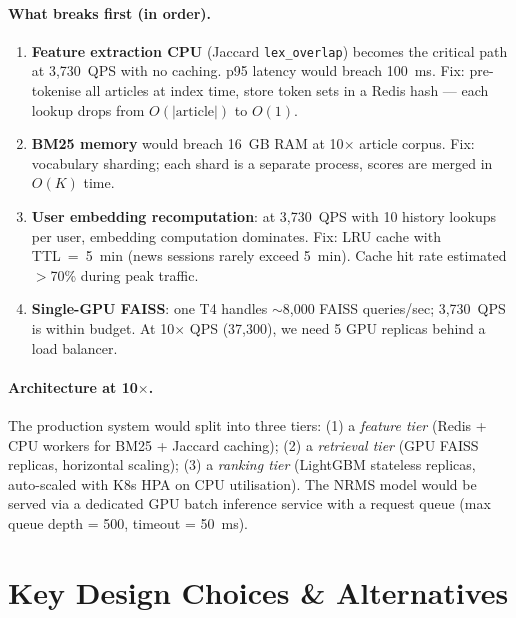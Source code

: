 \documentclass[11pt,a4paper]{article}
\newcommand{\feature}[1]{\texttt{#1}}
\begin{document}
\paragraph{What breaks first (in order).}
\begin{enumerate}[noitemsep]
  \item \textbf{Feature extraction CPU} (Jaccard \feature{lex\_overlap}) becomes the
        critical path at 3,730~QPS with no caching. p95 latency would breach 100~ms.
        Fix: pre-tokenise all articles at index time, store token sets in a Redis
        hash --- each lookup drops from $O(|\text{article}|)$ to $O(1)$.
  \item \textbf{BM25 memory} would breach 16~GB RAM at 10$\times$ article corpus.
        Fix: vocabulary sharding; each shard is a separate process, scores are
        merged in $O(K)$ time.
  \item \textbf{User embedding recomputation}: at 3,730~QPS with 10 history
        lookups per user, embedding computation dominates. Fix: LRU cache with
        TTL~=~5~min (news sessions rarely exceed 5~min). Cache hit rate
        estimated $>$70\% during peak traffic.
  \item \textbf{Single-GPU FAISS}: one T4 handles $\sim$8,000 FAISS queries/sec;
        3,730~QPS is within budget. At 10$\times$ QPS (37,300), we need 5 GPU replicas
        behind a load balancer.
\end{enumerate}

\paragraph{Architecture at 10$\times$.} The production system would split into
three tiers: (1) a \emph{feature tier} (Redis + CPU workers for BM25 + Jaccard
caching); (2) a \emph{retrieval tier} (GPU FAISS replicas, horizontal scaling);
(3) a \emph{ranking tier} (LightGBM stateless replicas, auto-scaled with K8s
HPA on CPU utilisation). The NRMS model would be served via a dedicated GPU
batch inference service with a request queue (max queue depth = 500,
timeout = 50~ms).

\section{Key Design Choices \& Alternatives}
\end{document}
